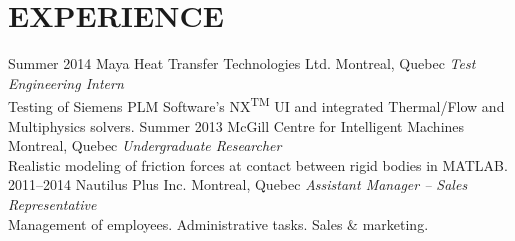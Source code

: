 

\section{EXPERIENCE}

\begin{entrylist}
\entry
{\small{Summer} 2014}
{Maya Heat Transfer Technologies Ltd.}
{Montreal, Quebec}
{\emph{Test Engineering Intern} \\
Testing of Siemens PLM Software’s NX\textsuperscript{\scriptsize TM} UI and integrated Thermal/Flow and Multiphysics solvers.
}
\entry
{\small{Summer} 2013}
{McGill Centre for Intelligent Machines}
{Montreal, Quebec}
{\emph{Undergraduate Researcher} \\
Realistic modeling of friction forces at contact between rigid bodies in MATLAB.
}
\entry
{2011--2014}
{Nautilus Plus Inc.}
{Montreal, Quebec}
{\emph{Assistant Manager -- Sales Representative} \\
Management of employees. Administrative tasks. Sales \& marketing.}
\end{entrylist}

